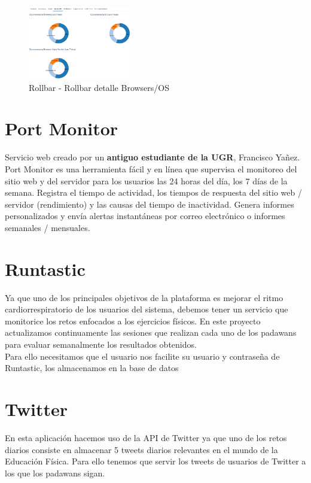 \begin{figure}[ht]
	\centering
	\includegraphics[width=0.4\textwidth]{imagenes/tecnologias/rollbar_error_browser_os.png}
	\caption{Rollbar - Rollbar detalle Browsers/OS}
	\label{rollbar_error_browser_os}
\end{figure}

\newpage

\section{Port Monitor \cite{PortMonitor}}
Servicio web creado por un \textbf{antiguo estudiante de la UGR}, Francisco Yañez. Port Monitor es una herramienta fácil y en línea que supervisa el monitoreo del sitio web y del servidor para los usuarios las 24 horas del día, los 7 días de la semana. Registra el tiempo de actividad, los tiempos de respuesta del sitio web / servidor (rendimiento) y las causas del tiempo de inactividad. Genera informes personalizados y envía alertas instantáneas por correo electrónico o informes semanales / mensuales.

\section{Runtastic}
Ya que uno de los principales objetivos de la plataforma es mejorar el ritmo cardiorrespiratorio de los usuarios del sistema, debemos tener un servicio que monitorice los retos enfocados a los ejercicios físicos. En este proyecto actualizamos continuamente las sesiones que realizan cada uno de los padawans para evaluar semanalmente los resultados obtenidos.\\

Para ello necesitamos que el usuario nos facilite su usuario y contraseña de Runtastic, los almacenamos en la base de datos

\newpage

\section{Twitter}
En esta aplicación hacemos uso de la API de Twitter ya que uno de los retos diarios consiste en almacenar 5 tweets diarios relevantes en el mundo de la Educación Física. Para ello tenemos que servir los tweets de usuarios de Twitter a los que los padawans sigan.\\


